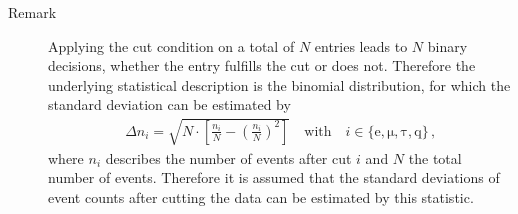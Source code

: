 \documentclass[11pt, a4paper]{article}
\numberwithin{equation}{section}
\begin{document}
\begin{description}
	\item[Remark] Applying the cut condition on a total of $N$ entries leads to $N$ binary decisions, whether the entry fulfills the cut or does not.
	Therefore the underlying statistical description is the binomial distribution, for which the standard deviation can be estimated by
	\begin{align*}
		\Delta n_i = \sqrt{N \cdot \left[ \frac{n_i}{N} - \left( \frac{n_i}{N} \right)^2 \right]} \quad \text{with}\quad i \in \{ \mathrm{e}, \mathrm{\mu}, \mathrm{\tau}, \mathrm{q} \} \,\text{,}
	\end{align*}
	where $n_i$ describes the number of events after cut $i$ and $N$ the total number of events.
	Therefore it is assumed that the standard deviations of event counts after cutting the data can be estimated by this statistic.
\end{description}
\end{document}
